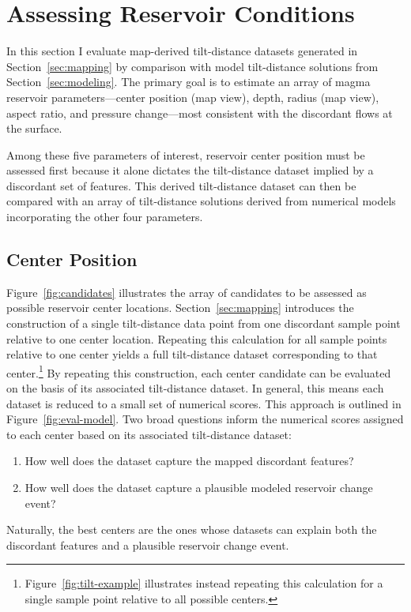 \section{Assessing Reservoir Conditions}\label{sec:evaluation}

In this section I evaluate map-derived tilt-distance datasets generated in Section~\ref{sec:mapping} by comparison with model tilt-distance solutions from Section~\ref{sec:modeling}. The primary goal is to estimate an array of magma reservoir parameters---center position (map view), depth, radius (map view), aspect ratio, and pressure change---most consistent with the discordant flows at the surface. 

Among these five parameters of interest, reservoir center position must be assessed first because it alone dictates the tilt-distance dataset implied by a discordant set of features. This derived tilt-distance dataset can then be compared with an array of tilt-distance solutions derived from numerical models incorporating the other four parameters.

\subsection{Center Position}\label{sec:center-location}

Figure~\ref{fig:candidates} illustrates the array of candidates to be assessed as possible reservoir center locations. Section~\ref{sec:mapping} introduces the construction of a single tilt-distance data point from one discordant sample point relative to one center location. Repeating this calculation for all sample points relative to one center yields a full tilt-distance dataset corresponding to that center.\footnote{Figure~\ref{fig:tilt-example} illustrates instead repeating this calculation for a single sample point relative to all possible centers.} By repeating this construction, each center candidate can be evaluated on the basis of its associated tilt-distance dataset. In general, this means each dataset is reduced to a small set of numerical scores. This approach is outlined in Figure~\ref{fig:eval-model}. Two broad questions inform the numerical scores assigned to each center based on its associated tilt-distance dataset:
\begin{enumerate}
    \item How well does the dataset capture the mapped discordant features?
    \item How well does the dataset capture a plausible modeled reservoir change event?
\end{enumerate}
Naturally, the best centers are the ones whose datasets can explain both the discordant features and a plausible reservoir change event.

